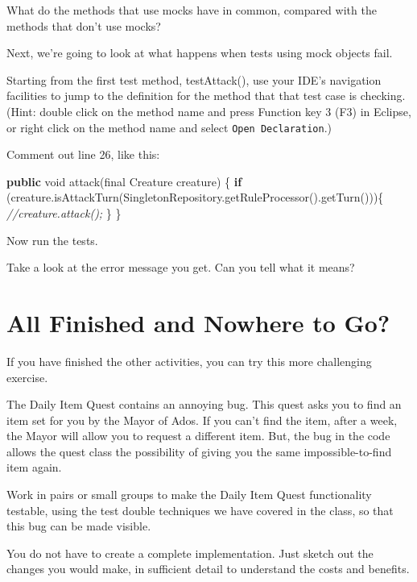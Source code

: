 \documentclass[
]{book}
\newenvironment{Shaded}{\begin{snugshade}}{\end{snugshade}}
\newcommand{\CommentTok}[1]{\textcolor[rgb]{0.56,0.35,0.01}{\textit{#1}}}
\newcommand{\DataTypeTok}[1]{\textcolor[rgb]{0.13,0.29,0.53}{#1}}
\newcommand{\FunctionTok}[1]{\textcolor[rgb]{0.00,0.00,0.00}{#1}}
\newcommand{\KeywordTok}[1]{\textcolor[rgb]{0.13,0.29,0.53}{\textbf{#1}}}
\newcommand{\NormalTok}[1]{#1}
\begin{document}
What do the methods that use mocks have in common, compared with the methods that don't use mocks?

Next, we're going to look at what happens when tests using mock objects fail.

Starting from the first test method, testAttack(), use your IDE's navigation facilities to jump to the definition for the method that that test case is checking. (Hint: double click on the method name and press Function key 3 (F3) in Eclipse, or right click on the method name and select \texttt{Open\ Declaration}.)

Comment out line 26, like this:

\begin{Shaded}
\begin{Highlighting}[]
\KeywordTok{public} \DataTypeTok{void} \FunctionTok{attack}\NormalTok{(}\DataTypeTok{final}\NormalTok{ Creature creature) \{}
    \KeywordTok{if}\NormalTok{ (creature.}\FunctionTok{isAttackTurn}\NormalTok{(SingletonRepository.}\FunctionTok{getRuleProcessor}\NormalTok{().}\FunctionTok{getTurn}\NormalTok{()))\{}
        \CommentTok{//creature.attack();}
\NormalTok{    \}}
\NormalTok{\}}
\end{Highlighting}
\end{Shaded}

Now run the tests.

Take a look at the error message you get. Can you tell what it means?

\hypertarget{next}{%
\section{All Finished and Nowhere to Go?}\label{next}}

If you have finished the other activities, you can try this more challenging exercise.

The Daily Item Quest contains an annoying bug. This quest asks you to find an item set for you by the Mayor of Ados. If you can't find the item, after a week, the Mayor will allow you to request a different item. But, the bug in the code allows the quest class the possibility of giving you the same impossible-to-find item again.

Work in pairs or small groups to make the Daily Item Quest functionality testable, using the test double techniques we have covered in the class, so that this bug can be made visible.

You do not have to create a complete implementation. Just sketch out the changes you would make, in sufficient detail to understand the costs and benefits.
\end{document}
